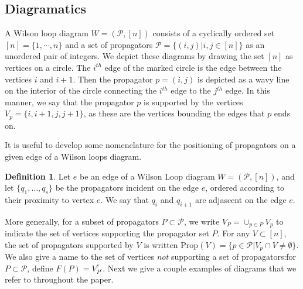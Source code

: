 \documentclass[11pt]{article}
\newcommand{\cP}{\mathcal{P}}
\newcommand{\Prop}{\textrm{Prop}}
\theoremstyle{remark}
\theoremstyle{definition}
\newtheorem{dfn}[thm]{Definition}
\begin{document}
\subsection{Diagramatics \label{sec:diagramdefs}}
A Wilson loop diagram $W = (\cP, [n])$ consists of a cyclically ordered set $[n] = \{1, \cdots, n\}$ and a set of propagators $\cP = \{(i,j) | i, j \in [n]\}$ as an unordered pair of integers. We depict these diagrams by drawing the set $[n]$ as vertices on a circle. The $i^{th}$ edge of the marked circle is the edge between the vertices $i$ and $i+1$. Then the propagator $p =(i,j)$ is depicted as a wavy line on the interior of the circle connecting the $i^{th}$ edge to the $j^{th}$ edge. In this manner, we say that the propagator $p$ is supported by the vertices $V_p = \{i, i+1, j, j+1\}$, as these are the vertices bounding the edges that $p$ ends on. 

It is useful to develop some nomenclature for the positioning of propagators on a given edge of a Wilson loops diagram.  
\begin{dfn}\label{dfn:adjascentprops} Let $e$ be an edge of a Wilson Loop diagram $W = (\cP, [n])$, and  let $\{q_1, \ldots, q_s \}$ be the propagators incident on the edge $e$, ordered according to their proximity to vertex $e$. We say that $q_i$ and $q_{i+1}$ are adjascent on the edge $e$. \end{dfn}

More generally, for a subset of propagators $P \subset \cP$, we write $V_P = \cup_{p \in P} V_p$ to indicate the set of vertices supporting the propagator set $P$. For any $V \subset [n]$, the set of propagators supported by $V$ is written $\Prop(V) = \{ p \in \cP | V_p \cap V \neq \emptyset\}$.  We also give a name to the set of vertices \emph{not} supporting a set of propagators:for $P \subset \cP$, define $F(P) = V_{P^c}^c$. Next we give a couple examples of diagrams that we refer to throughout the paper.
\end{document}
